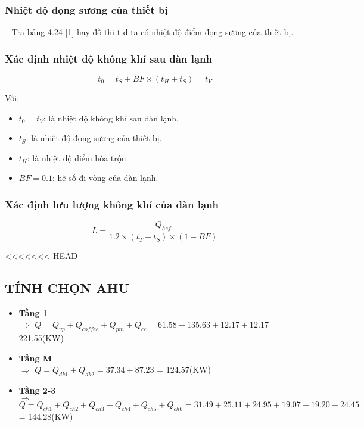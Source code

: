 \subsubsection{Nhiệt độ đọng sương của thiết bị}
-- Tra bảng 4.24 [1] hay đồ thi t-d ta có nhiệt độ điểm đọng sương của thiết bị.
\subsubsection{Xác định nhiệt độ không khí sau dàn lạnh}
\begin{equation*}
	t_{0} = t_{S} + BF\times (t_{H} + t_{S}) = t_{V}
\end{equation*}

Với:
\begin{itemize}
	\item $t_{0} = t_{V}$: là nhiệt độ không khí sau dàn lạnh.
	\item $t_{S}$: là nhiệt độ đọng sương của thiết bị.
	\item $t_{H}$:  là nhiệt độ điểm hòa trộn.
	\item $BF = 0.1$: hệ số đi vòng của dàn lạnh.
\end{itemize}
\subsubsection{Xác định lưu lượng không khí của dàn lạnh}
\begin{equation*}
	L = \dfrac{Q_{hef}}{1.2\times (t_{T} - t_{S})\times (1-BF)}
\end{equation*}

<<<<<<< HEAD
\subsection{TÍNH CHỌN AHU}
\begin{itemize}
	\item \textbf{Tầng 1}\\
	 $\Rightarrow$ $Q = Q_{vp} + Q_{coffee} + Q_{pm} + Q_{cc} = 61.58 + 135.63 + 12.17 + 12.17$ = 221.55(KW)
	 
	 \item \textbf{Tầng M}\\
	 $\Rightarrow$ $Q = Q_{dk1} + Q_{dk2} = 37.34 + 87.23$ = 124.57(KW)
	 
	 \item \textbf{Tầng 2-3}\\
	 $\Rightarrow$ $Q = Q_{ch1} + Q_{ch2} + Q_{ch3} + Q_{ch4} + Q_{ch5} + Q_{ch6} = 31.49 + 25.11 + 24.95 + 19.07 + 19.20 + 24.45$ = 144.28(KW)
\end{itemize}

